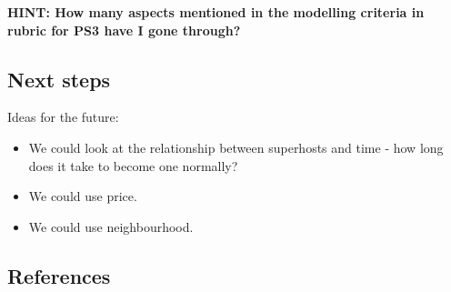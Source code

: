 \documentclass[
]{book}
\providecommand{\tightlist}{%
  \setlength{\itemsep}{0pt}\setlength{\parskip}{0pt}}
\begin{document}
\textbf{HINT: How many aspects mentioned in the modelling criteria in rubric for PS3 have I gone through?}

\hypertarget{next-steps-2}{%
\subsection{Next steps}\label{next-steps-2}}

Ideas for the future:

\begin{itemize}
\tightlist
\item
  We could look at the relationship between superhosts and time - how long does it take to become one normally?
\item
  We could use price.
\item
  We could use neighbourhood.
\end{itemize}

\hypertarget{references-1}{%
\subsection{References}\label{references-1}}
\end{document}
